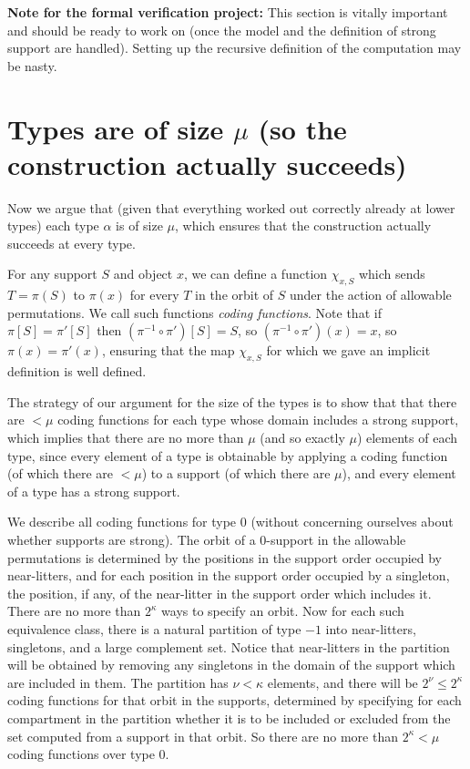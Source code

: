 {\bf Note for the formal verification project:}  This section is vitally important and should be ready to work on (once the model and the definition of strong support are handled).  Setting up the recursive definition of the computation may be nasty.

\newpage
\section{Types are of size \texorpdfstring{$\mu$}{μ} (so the construction actually succeeds)}

Now we argue that (given that everything worked out correctly already at lower types) each type $\alpha$ is of size $\mu$, which ensures
that the construction actually succeeds at every type.



For any support $S$ and object $x$, we can define a function $\chi_{x,S}$ which sends $T=\pi(S)$ to $\pi(x)$ for every $T$ in the orbit of $S$ under
the action of allowable permutations.  We call such functions {\em coding functions\/}.  Note that if $\pi[S]=\pi'[S]$ then $(\pi^{-1}\circ \pi')[S]= S$, so
$(\pi^{-1}\circ \pi')(x)= x$, so $\pi(x)=\pi'(x)$, ensuring that the map $\chi_{x,S}$ for which we gave an implicit definition is well defined.

The strategy of our argument for the size of the types is to show that that there are $<\mu$ coding functions for each type whose domain includes a strong support, which implies that there are no more than $\mu$ (and so exactly $\mu$) elements of each type, since every element of a type is obtainable by applying a coding function (of which there are $<\mu$) to a support (of which there are $\mu$), and every element of a type has a strong support.

We describe all coding functions for type 0 (without concerning ourselves about whether supports are strong).  The orbit of a 0-support in the allowable permutations is determined by the positions in the support order occupied by near-litters, and for each position in the support order occupied by a singleton, the position, if any, of the near-litter in the support order which includes it.  There are no more than $2^\kappa$ ways to specify an orbit.  Now for each such equivalence class, there is a natural partition of type $-1$ into near-litters, singletons, and a large complement set.  Notice that near-litters in the partition will be obtained by removing any singletons in the domain of the support which are included in them.  The partition has $\nu<\kappa$ elements, and there will be $2^\nu\leq 2^\kappa$ coding functions for that orbit in the supports, determined by specifying for each compartment in the partition whether it is to be included or excluded from the set computed from a support in that orbit.  So there are no more than $2^\kappa<\mu$ coding functions over type 0.

